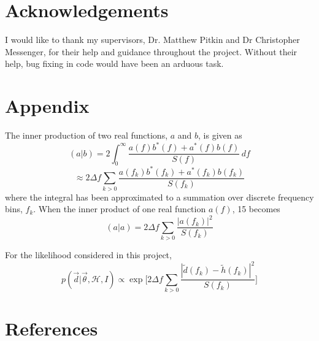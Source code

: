\documentclass{jpconf}
\newcommand{\curlH}{\mathcal{H}}
\begin{document}
\section{Acknowledgements}
\label{sec:ackn}

I would like to thank my supervisors, Dr. Matthew Pitkin and Dr Christopher Messenger, for their help and guidance throughout the project. Without their help, bug fixing in code would have been an arduous task.



\section*{Appendix}
The inner production of two real functions, $a$ and $b$, is given as
\begin{equation}
  (a|b) = 2 \int_0^{\infty} \frac{a(f)b^*(f) + a^*(f)b(f)}{S(f)} \, df
\end{equation}
\begin{equation}
  \label{eq:blah}
  \approx 2 \Delta f \sum_{k>0} \frac{a(f_{k})b^*(f_{k}) + a^*(f_{k})b(f_{k})}{S(f_{k})}
\end{equation}
 where the integral has been approximated to a summation over discrete frequency bins, $f_{k}$. When the inner product of one real function $a(f)$, 15 becomes
 \begin{equation}
   (a|a) = 2 \Delta f \sum_{k>0} \frac{|a(f_k)|^{2}}{S(f_{k})}
 \end{equation}

For the likelihood considered in this project,
 \begin{equation}
    p(\vec{d} | \vec{\theta}, \curlH, I) \propto \exp\Bigg[ 2\Delta f\sum_{k>0}\frac{|\tilde{d}(f_{k}) - \tilde{h}(f_{k})|^{2}}{S(f_{k})} \Bigg]
 \end{equation}


\section{References}
\label{sec:ref}


\end{document}
